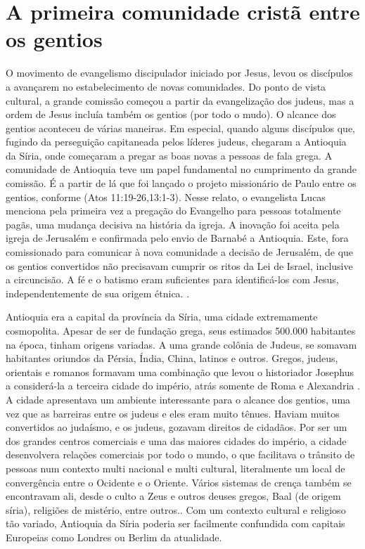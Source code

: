 \documentclass[12pt]{abntex2}
\begin{document}
\section{A primeira comunidade cristã entre os gentios}

O movimento de evangelismo discipulador iniciado por Jesus, levou os discípulos a avançarem no estabelecimento de novas comunidades. Do ponto de vista cultural, a grande comissão começou a partir da evangelização dos judeus, mas a ordem de Jesus incluía também os gentios (por todo o mudo). O alcance dos gentios aconteceu de várias maneiras. Em especial, quando alguns discípulos que, fugindo da perseguição capitaneada pelos líderes judeus, chegaram a Antioquia da Síria, onde começaram a pregar as boas novas a pessoas de fala grega. A comunidade de Antioquia teve um papel fundamental no cumprimento da grande comissão. É a partir de lá que foi lançado o projeto missionário de Paulo entre os gentios, conforme (Atos 11:19-26,13:1-3). Nesse relato, o evangelista Lucas menciona pela primeira vez a pregação do Evangelho para pessoas totalmente pagãs, uma mudança decisiva na história da igreja. A inovação foi aceita pela igreja de Jerusalém e confirmada pelo envio de Barnabé a Antioquia. Este, fora comissionado para comunicar à nova comunidade a decisão de Jerusalém, de que os gentios convertidos não precisavam cumprir os ritos da Lei de Israel, inclusive a circuncisão. A fé e o batismo eram suficientes para identificá-los com Jesus, independentemente de sua origem étnica. \cite[p. 198]{green}.

Antioquia era a capital da província da Síria, uma cidade extremamente cosmopolita. Apesar de ser de fundação grega, seus estimados 500.000 habitantes na época, tinham origens variadas. A uma grande colônia de Judeus, se somavam habitantes oriundos da Pérsia, Índia, China, latinos e outros. Gregos, judeus, orientais e romanos formavam uma combinação que levou o historiador Josephus a considerá-la a terceira cidade do império, atrás somente de Roma e Alexandria \cite[p. 185]{stott}. A cidade apresentava um ambiente interessante para o alcance dos gentios, uma vez que as barreiras entre os judeus e eles eram muito tênues. Haviam muitos convertidos ao judaísmo, e os judeus, gozavam direitos de cidadãos. Por ser um dos grandes centros comerciais e uma das maiores cidades do império, a cidade desenvolvera relações comerciais por todo o mundo, o que facilitava o trânsito de pessoas num contexto multi nacional e multi cultural, literalmente um local de convergência entre o Ocidente e o Oriente. Vários sistemas de crença também se encontravam ali, desde o culto a Zeus e outros deuses gregos, Baal (de origem síria), religiões de mistério, entre outros.\cite[p. 166,167]{green}. Com um contexto cultural e religioso tão variado, Antioquia da Síria poderia ser facilmente confundida com capitais Europeias como Londres ou Berlim da atualidade.
\end{document}
